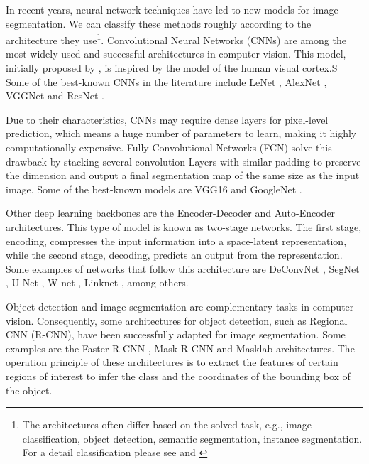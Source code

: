 In recent years, neural network techniques have led to new models for image segmentation. We can classify these methods roughly according to the architecture they use\footnote{The architectures often differ based on the solved task, e.g., image classification, object detection, semantic segmentation, instance segmentation. For a detail classification please see \citep{Sultana.Sufian.ea:KBS:2020} and \citep{Minaee.Boykov.ea:PAMI:2021}}. Convolutional Neural Networks  (CNNs) are among the most widely used and successful architectures in computer vision. This model, initially proposed by \cite{Fukushima:BC:1980}, is inspired by the model of the human visual cortex.S Some of the best-known CNNs in the literature include LeNet \citep{Lecun.Bottou.ea::1998}, AlexNet \citep{Krizhevsky.Sutskever.ea:NIPS:2012}, VGGNet \citep{Simonyan.Zisserman:arXiv:2015} and ResNet \citep{He.Zhang.ea:ICVPR:2016}. 

Due to their characteristics, CNNs may require dense layers for pixel-level prediction, which means a huge number of parameters to learn, making it highly computationally expensive. Fully Convolutional Networks (FCN) \citep{Long.Shelhamer.ea:CVPR:2015} solve this drawback by stacking several convolution Layers with similar padding to preserve the dimension and output a final segmentation map of the same size as the input image. Some of the best-known models are VGG16 and GoogleNet \citep{Szegedy.Liu.ea:arXiv:2014}.

Other deep learning backbones are the Encoder-Decoder and Auto-Encoder architectures. This type of model is known as two-stage networks. The first stage, encoding, compresses the input information into a space-latent representation, while the second stage, decoding, predicts an output from the representation. Some examples of networks that follow this architecture are DeConvNet \citep{Noh.Hong.ea:ICCV:2015}, SegNet \citep{Badrinarayanan.Kendall.ea:PAMI:2017}, U-Net \citep{Ronneberger.Fischer.ea:MICCAI:2015}, W-net \citep{Xia.Kulis:arXiv:2017}, Linknet \citep{Chaurasia.Culurciello:VCIP:2017}, among others.

Object detection and image segmentation are complementary tasks in computer vision. Consequently, some architectures for object detection, such as Regional CNN (R-CNN), have been successfully adapted for image segmentation. Some examples are the Faster R-CNN \citep{Ren.He.ea:PAMI:2017}, Mask R-CNN \citep{He.Gkioxari.ea:PAMI:2020} and Masklab \citep{Chen.Hermans.ea:CVPR:2018} architectures. The operation principle of these architectures is to extract the features of certain regions of interest to infer the class and the coordinates of the bounding box of the object.

